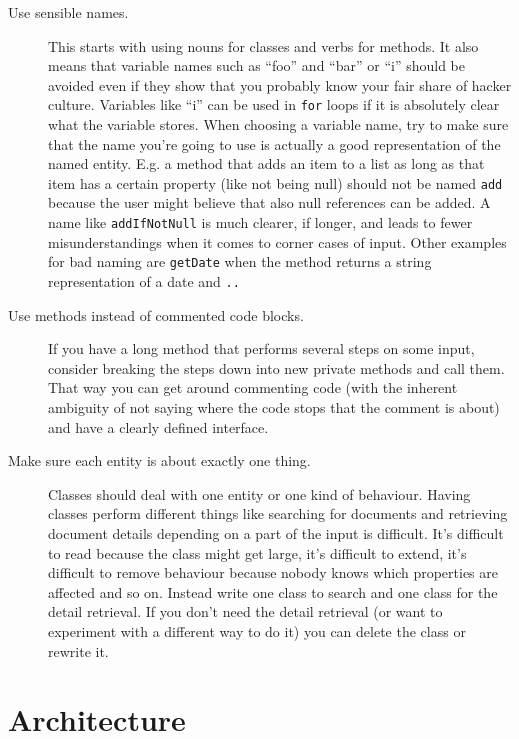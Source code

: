 \documentclass[12pt]{book}
\begin{document}
\begin{description}
\item[Use sensible names.] This starts with using nouns for classes and verbs for methods. It also means that variable names such as ``foo'' and ``bar'' or ``i'' should be avoided even if they show that you probably know your fair share of hacker culture. Variables like ``i'' can be used in {\tt for} loops if it is absolutely clear what the variable stores. When choosing a variable name, try to make sure that the name you're going to use is actually a good representation of the named entity. E.g. a method that adds an item to a list as long as that item has a certain property (like not being null) should not be named {\tt add} because the user might believe that also null references can be added. A name like {\tt addIfNotNull} is much clearer, if longer, and leads to fewer misunderstandings when it comes to corner cases of input. Other examples for bad naming are {\tt getDate} when the method returns a string representation of a date and {\tt ..}
\item[Use methods instead of commented code blocks.] If you have a long method that performs several steps on some input, consider breaking the steps down into new private methods and call them. That way you can get around commenting code (with the inherent ambiguity of not saying where the code stops that the comment is about) and have a clearly defined interface.
\item[Make sure each entity is about exactly one thing.] Classes should deal with one entity or one kind of behaviour. Having classes perform different things like searching for documents and retrieving document details depending on a part of the input is difficult. It's difficult to read because the class might get large, it's difficult to extend, it's difficult to remove behaviour because nobody knows which properties are affected and so on. Instead write one class to search and one class for the detail retrieval. If you don't need the detail retrieval (or want to experiment with a different way to do it) you can delete the class or rewrite it.
\end{description}








%
%
%
%
%
\chapter{Architecture}
\end{document}

